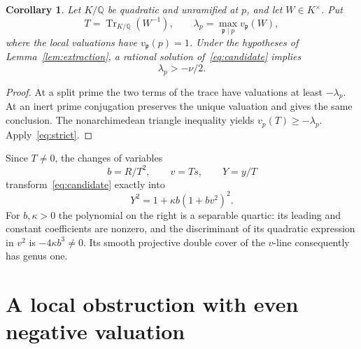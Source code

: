 \documentclass[11pt,a4paper]{article}
\newtheorem{corollary}[theorem]{Corollary}
\theoremstyle{definition}\newtheorem{definition}[theorem]{Definition}
\newcommand{\Q}{\mathbb Q}\newcommand{\Z}{\mathbb Z}
\begin{document}
\begin{corollary}\label{cor:trace}
Let $K/\Q$ be quadratic and unramified at $p$, and let
$W\in K^\times$. Put
\[
 T=\operatorname{Tr}_{K/\Q}(W^{-1}),\qquad
 \lambda_p=\max_{\mathfrak p\mid p}v_{\mathfrak p}(W),
\]
where the local valuations have $v_{\mathfrak p}(p)=1$.
Under the hypotheses of Lemma~\ref{lem:extraction}, a rational
solution of~\eqref{eq:candidate} implies
\[
                         \lambda_p>-\nu/2.
\]
\end{corollary}
\begin{proof}
At a split prime the two terms of the trace have valuations at least
$-\lambda_p$. At an inert prime conjugation preserves the unique
valuation and gives the same conclusion. The nonarchimedean
triangle inequality yields $v_p(T)\ge-\lambda_p$.
Apply~\eqref{eq:strict}.
\end{proof}

Since $T\ne0$, the changes of variables
\[
             b=R/T^2,\qquad v=Ts,\qquad Y=y/T
\]
transform~\eqref{eq:candidate} exactly into
\begin{equation}\label{eq:quartic}
                   Y^2=1+\kappa b(1+bv^2)^2.
\end{equation}
For $b,\kappa>0$ the polynomial on the right is a separable
quartic: its leading and constant coefficients are nonzero, and
the discriminant of its quadratic expression in $v^2$ is
$-4\kappa b^3\ne0$. Its smooth projective double cover of
the $v$-line consequently has genus one.

\section{A local obstruction with even negative valuation}
\end{document}
